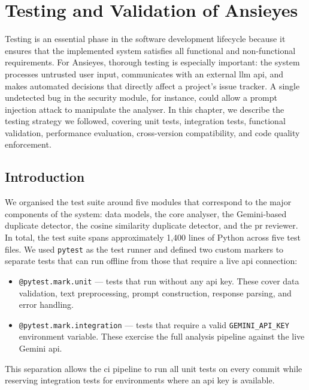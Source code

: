 \chapter{Testing and Validation of Ansieyes}

Testing is an essential phase in the software development lifecycle because it ensures that the implemented system satisfies all functional and non-functional requirements. For Ansieyes, thorough testing is especially important: the system processes untrusted user input, communicates with an external \gls{llm} \gls{api}, and makes automated decisions that directly affect a project's issue tracker. A single undetected bug in the security module, for instance, could allow a prompt injection attack to manipulate the analyser. In this chapter, we describe the testing strategy we followed, covering unit tests, integration tests, functional validation, performance evaluation, cross-version compatibility, and code quality enforcement.

\section{Introduction}

We organised the test suite around five modules that correspond to the major components of the system: data models, the core analyser, the Gemini-based duplicate detector, the cosine similarity duplicate detector, and the \gls{pr} reviewer. In total, the test suite spans approximately 1,400 lines of Python across five test files. We used \texttt{pytest} as the test runner and defined two custom markers to separate tests that can run offline from those that require a live \gls{api} connection:

\begin{itemize}
\item \texttt{@pytest.mark.unit} --- tests that run without any \gls{api} key. These cover data validation, text preprocessing, prompt construction, response parsing, and error handling.
\item \texttt{@pytest.mark.integration} --- tests that require a valid \texttt{GEMINI\_API\_KEY} environment variable. These exercise the full analysis pipeline against the live Gemini \gls{api}.
\end{itemize}

This separation allows the \gls{ci} pipeline to run all unit tests on every commit while reserving integration tests for environments where an \gls{api} key is available.

